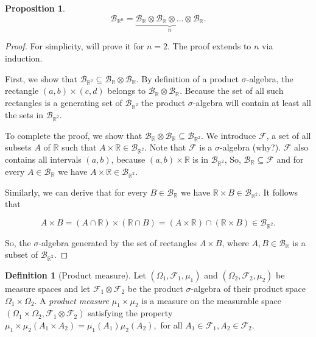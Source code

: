 \documentclass{book}
\theoremstyle{plain}%
\newtheorem{proposition}{Proposition}[section]
\theoremstyle{definition}
\newtheorem{definition}{Definition}[section]
\begin{document}
\begin{proposition}
$$\mathcal{B}_{\mathbb{R}^n} = \underbrace{\mathcal{B}_\mathbb{R} \otimes \mathcal{B}_\mathbb{R} \otimes \hdots \otimes \mathcal{B}_\mathbb{R}}_n.$$
\end{proposition}

\begin{proof}
For simplicity, will prove it for $n = 2$. The proof extends to $n$ via induction.

First, we show that $\mathcal{B}_{\mathbb{R}^2} \subseteq \mathcal{B}_\mathbb{R} \otimes \mathcal{B}_\mathbb{R}$. By definition of a product $\sigma$-algebra, the rectangle $(a,b) \times (c, d)$ belongs to $\mathcal{B}_\mathbb{R} \otimes \mathcal{B}_\mathbb{R}$. Because the set of all such rectangles is a generating set of $\mathcal{B}_{\mathbb{R}^2}$ the product $\sigma$-algebra will contain at least all the sets in $\mathcal{B}_{\mathbb{R}^2}$.

To complete the proof, we show that $\mathcal{B}_\mathbb{R} \otimes \mathcal{B}_\mathbb{R} \subseteq \mathcal{B}_{\mathbb{R}^2}$. We introduce $\mathcal{F}$, a set of all subsets $A$ of $\mathbb{R}$ such that $A \times \mathbb{R} \in \mathcal{B}_{\mathbb{R}^2}$. Note that $\mathcal{F}$ is a $\sigma$-algebra (why?). $\mathcal{F}$ also contains all intervals $(a, b)$, because $(a, b) \times \mathbb{R}$ is in $\mathcal{B}_{\mathbb{R}^2}$, So, $\mathcal{B}_\mathbb{R} \subseteq \mathcal{F}$ and for every $A \in \mathcal{B}_\mathbb{R}$ we have $A \times \mathbb{R} \in \mathcal{B}_{\mathbb{R}^2}$.

Similarly, we can derive that for every $B \in \mathcal{B}_\mathbb{R}$ we have $\mathbb{R}  \times B\in \mathcal{B}_{\mathbb{R}^2}$. It follows that 

$$A \times B = (A \cap \mathbb{R}) \times (\mathbb{R} \cap B) = (A \times \mathbb{R}) \cap (\mathbb{R} \times B) \in \mathcal{B}_{\mathbb{R}^2}.$$

So, the $\sigma$-algebra generated by the set of rectangles $A \times B$, where $A, B \in \mathcal{B}_\mathbb{R}$ is a subset of $\mathcal{B}_{\mathbb{R}^2}$.
\end{proof}

\begin{definition}[Product measure] Let $(\Omega_1, \mathcal{F}_1, \mu_1)$ and $(\Omega_2, \mathcal{F}_2, \mu_2)$ be measure spaces and let $\mathcal{F}_1 \otimes \mathcal{F}_2$ be the product $\sigma$-algebra of their product space $\Omega_1 \times \Omega_2$. A \emph{product measure} $\mu_1 \times \mu_2$ is a measure on the measurable space $(\Omega_1 \times \Omega_2, \mathcal{F}_1 \otimes \mathcal{F}_2)$ satisfying the property $\mu_1 \times \mu_2(A_1 \times A_2) = \mu_1(A_1)\mu_2(A_2),$ for all $A_1 \in \mathcal{F}_1, A_2 \in \mathcal{F}_2$.
\end{definition}
\end{document}
